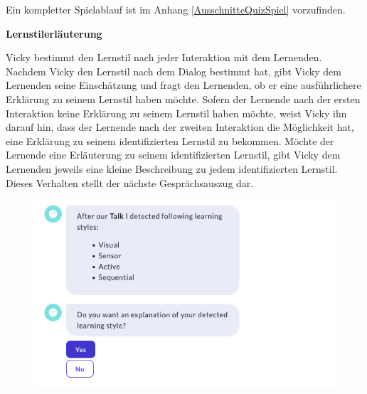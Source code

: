 Ein kompletter Spielablauf ist im Anhang \ref{AusschnitteQuizSpiel} vorzufinden.

\textbf{Lernstilerläuterung}

Vicky bestimmt den Lernstil nach jeder Interaktion mit dem Lernenden.
Nachdem Vicky den Lernstil nach dem Dialog
bestimmt hat, gibt Vicky dem Lernenden seine Einschätzung und fragt den 
Lernenden, ob er eine ausführlichere Erklärung zu seinem 
Lernstil haben möchte. Sofern der Lernende nach der ersten Interaktion keine Erklärung zu 
seinem Lernstil haben möchte, weist Vicky ihn darauf hin, dass der Lernende nach der zweiten Interaktion 
die Möglichkeit hat, eine Erklärung zu seinem identifizierten Lernstil zu bekommen.
Möchte der Lernende eine Erläuterung
zu seinem identifizierten Lernstil, gibt Vicky dem Lernenden 
jeweils eine kleine Beschreibung zu jedem identifizierten Lernstil.
Dieses Verhalten stellt der nächste Gesprächsauszug dar.
\begin{figure}[H]
  \centering
  \includegraphics[width=0.6\linewidth]{images/Talk_roterMarker/Talkend.png}
\end{figure} 
